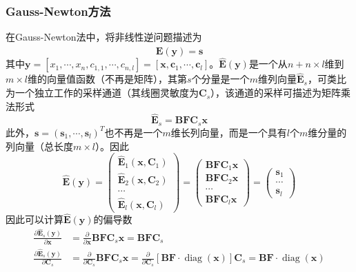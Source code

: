 \documentclass[12pt]{article}
\begin{document}
\subsubsection{Gauss-Newton方法}\label{chap:2.6.1.1}
在Gauss-Newton法中，将非线性逆问题描述为
\begin{equation}
    \widehat{\bm{E}}(\bm{y})=\bm{s}
    \label{equ:2.41.0}
\end{equation}
其中$\bm{y}=[x_1,\cdots,x_n,c_{1,1},\cdots,c_{n,l}]=[\bm{x},\mathbf{c}_1,\cdots,\mathbf{c}_l]$。$\widehat{\bm{E}}(\bm{y})$是一个从$n+n\times l$维到$m\times l$维的向量值函数（不再是矩阵），其第$s$个分量是一个$m$维列向量$\widehat{\bm{E}}_s$，可类比为一个独立工作的采样通道（其线圈灵敏度为$\mathbf{C}_s$），该通道的采样可描述为矩阵乘法形式
\begin{equation}
    \widehat{\bm{E}}_s=\mathbf{B}\mathbf{F}\mathbf{C}_s\bm{x}
\end{equation}
此外，$\bm{s}=(\bm{s}_1,\cdots,\bm{s}_l)^T$也不再是一个$m$维长列向量，而是一个具有$l$个$m$维分量的列向量（总长度$m\times l$）。因此
\begin{equation}
    \widehat{\bm{E}}(\bm{y})
    =\begin{pmatrix}
        \widehat{\bm{E}}_1(\bm{x},\mathbf{C}_1) \\
        \widehat{\bm{E}}_2(\bm{x},\mathbf{C}_2) \\
        \cdots \\
        \widehat{\bm{E}}_l(\bm{x},\mathbf{C}_l)
    \end{pmatrix}
    =\begin{pmatrix}
        \mathbf{B}\mathbf{F}\mathbf{C}_1\bm{x} \\
        \mathbf{B}\mathbf{F}\mathbf{C}_2\bm{x} \\
        \cdots \\
        \mathbf{B}\mathbf{F}\mathbf{C}_l\bm{x}
    \end{pmatrix}
    =\begin{pmatrix} \bm{s}_1 \\ \cdots \\ \bm{s}_l \end{pmatrix}
\end{equation}
因此可以计算$\widehat{\bm{E}}(\bm{y})$的偏导数
\begin{align}
    \frac{\partial\widehat{\bm{E}}_s(\bm{y})}{\partial\bm{x}}
    &=\frac{\partial}{\partial\bm{x}}\mathbf{B}\mathbf{F}\mathbf{C}_s\bm{x}=\mathbf{B}\mathbf{F}\mathbf{C}_s \\
    \frac{\partial\widehat{\bm{E}}_s(\bm{y})}{\partial\mathbf{C}_s}
    &=\frac{\partial}{\partial\mathbf{C}_s}\mathbf{B}\mathbf{F}\mathbf{C}_s\bm{x}=\frac{\partial}{\partial\mathbf{C}_s}[\mathbf{B}\mathbf{F}\cdot\operatorname{diag}(\bm{x})]\mathbf{C}_s=\mathbf{B}\mathbf{F}\cdot\operatorname{diag}(\bm{x})
\end{align}
\end{document}
